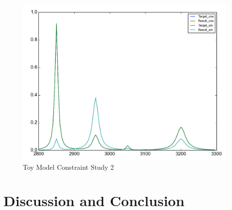 \begin{figure}[!ht] \label{fig:3.6}
\centering
\includegraphics[scale=0.3]{Figures/toy_model_result_plotting_ir_sin_10candi_constraint_study_experiment5.png} 
\caption{Toy Model Constraint Study 2}
\end{figure}

\section{Discussion and Conclusion}


